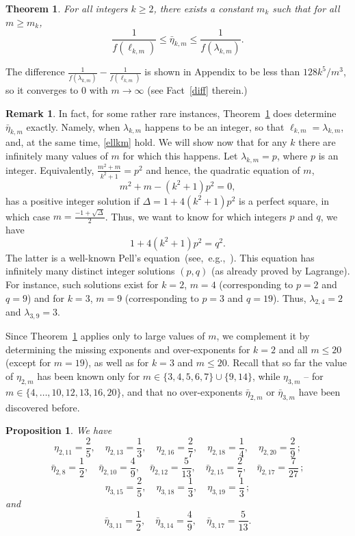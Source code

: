 \documentclass[reqno, 12pt]{amsart}
\numberwithin{equation}{section}
\numberwithin{figure}{section}
\theoremstyle{plain}
\newtheorem{theorem}[thm]{Theorem}
\newtheorem{prop}[thm]{Proposition}
\theoremstyle{definition}
\newtheorem{rem}[thm]{Remark}
\begin{document}
\begin{theorem}\label{new_bounds}
For all integers $k\ge2$, there exists a constant $m_k$ such that for all $m\ge m_k$,
$$\frac1{f(\ell_{k,m})}\le \bar\eta_{k,m}\le\frac1{f(\lambda_{k,m})}.$$
\end{theorem}

The difference $\frac1{f(\lambda_{k,m})}-\frac1{f(\ell_{k,m})}$ is shown in Appendix to be less than $128k^5/m^3$, so it converges to 0 with $m\to\infty$ (see Fact~\ref{diff} therein.)



\begin{rem}
In fact, for some rather rare instances, Theorem~\ref{new_bounds} does determine $\bar\eta_{k,m}$ exactly. Namely, when $\lambda_{k,m}$ happens to be an integer, so that $\ell_{k,m}=\lambda_{k,m}$, and, at the same time, \eqref{ellkm} hold. We will show now that for any $k$ there are infinitely many values of $m$ for which this happens. Let $\lambda_{k,m} = p$, where $p$ is an integer. Equivalently, $\frac{m^2+m}{k^2+1}=p^2$ and hence, the quadratic equation of $m$,
\[
m^2+m - (k^2+1)p^2=0,
\]
has a positive integer solution if $\Delta = 1+4(k^2+1)p^2$ is a perfect square, in which case $m=\frac{-1+\sqrt{\Delta}}{2}$.
Thus, we want to know for which integers $p$ and $q$, we have
\[
1+4(k^2+1)p^2 = q^2.
\]
The latter is a well-known Pell's equation~(see,~e.g.,~\cite{Pell}). This equation has infinitely many distinct integer solutions $(p,q)$ (as already proved by Lagrange). For instance, such solutions exist for $k=2$, $m=4$ (corresponding to $p=2$ and $q=9$) and for $k=3$, $m=9$ (corresponding to $p=3$ and $q=19$). Thus, $\lambda_{2,4}=2$ and $\lambda_{3,9}=3$.
\end{rem}

Since Theorem~\ref{new_bounds} applies only to large values of $m$, we complement it by determining the missing exponents and over-exponents for $k=2$ and all $m\le 20$ (except for $m=19$), as well as for $k=3$ and $m\le20$. Recall that so far the value of $\eta_{2,m}$ has been known only for $m\in\{3,4,5,6,7\}\cup\{9,14\}$, while $\eta_{3,m}$ -- for $m\in\{4,\dots,10, 12,13, 16, 20\}$,   and that no over-exponents $\bar\eta_{2,m}$ or $\bar\eta_{3,m}$ have been discovered before. %

\begin{prop}\label{k2} We have %
$$\eta_{2,11}=\frac25,\quad \eta_{2,13}=\frac13,\quad\eta_{2,16}=\frac27,\quad\eta_{2,18}=\frac14,\quad\eta_{2,20}=\frac29\,;$$
$$\bar\eta_{2,8}=\frac12,\quad \bar\eta_{2,10}=\frac49,\quad \bar\eta_{2,12}=\frac5{13},\quad\bar\eta_{2,15}=\frac27,\quad\bar\eta_{2,17}=\frac{7}{27}\,;$$
$$ \eta_{3,15}=\frac25,\quad \eta_{3,18}=\frac13,\quad \eta_{3,19}=\frac13\,;$$
and %
$$\bar\eta_{3,11}=\frac12,\quad \bar\eta_{3,14}=\frac49,\quad\bar\eta_{3,17}=\frac5{13}.$$
\end{prop}
\end{document}
